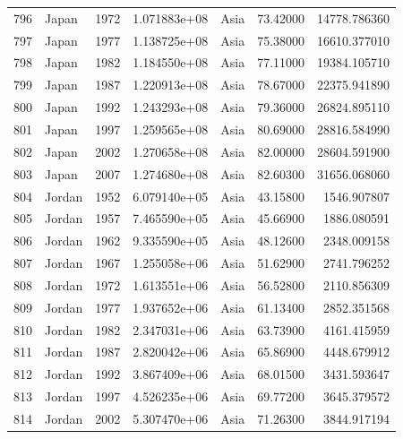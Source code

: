 \documentclass[
  letterpaper,
  DIV=11,
  numbers=noendperiod]{scrreprt}
\begin{document}
\begin{tabular}{llrrlrr}
796  &                     Japan &  1972 &  1.071883e+08 &      Asia &  73.42000 &   14778.786360 \\
797  &                     Japan &  1977 &  1.138725e+08 &      Asia &  75.38000 &   16610.377010 \\
798  &                     Japan &  1982 &  1.184550e+08 &      Asia &  77.11000 &   19384.105710 \\
799  &                     Japan &  1987 &  1.220913e+08 &      Asia &  78.67000 &   22375.941890 \\
800  &                     Japan &  1992 &  1.243293e+08 &      Asia &  79.36000 &   26824.895110 \\
801  &                     Japan &  1997 &  1.259565e+08 &      Asia &  80.69000 &   28816.584990 \\
802  &                     Japan &  2002 &  1.270658e+08 &      Asia &  82.00000 &   28604.591900 \\
803  &                     Japan &  2007 &  1.274680e+08 &      Asia &  82.60300 &   31656.068060 \\
804  &                    Jordan &  1952 &  6.079140e+05 &      Asia &  43.15800 &    1546.907807 \\
805  &                    Jordan &  1957 &  7.465590e+05 &      Asia &  45.66900 &    1886.080591 \\
806  &                    Jordan &  1962 &  9.335590e+05 &      Asia &  48.12600 &    2348.009158 \\
807  &                    Jordan &  1967 &  1.255058e+06 &      Asia &  51.62900 &    2741.796252 \\
808  &                    Jordan &  1972 &  1.613551e+06 &      Asia &  56.52800 &    2110.856309 \\
809  &                    Jordan &  1977 &  1.937652e+06 &      Asia &  61.13400 &    2852.351568 \\
810  &                    Jordan &  1982 &  2.347031e+06 &      Asia &  63.73900 &    4161.415959 \\
811  &                    Jordan &  1987 &  2.820042e+06 &      Asia &  65.86900 &    4448.679912 \\
812  &                    Jordan &  1992 &  3.867409e+06 &      Asia &  68.01500 &    3431.593647 \\
813  &                    Jordan &  1997 &  4.526235e+06 &      Asia &  69.77200 &    3645.379572 \\
814  &                    Jordan &  2002 &  5.307470e+06 &      Asia &  71.26300 &    3844.917194 \\

\end{tabular}
\end{document}
